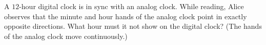 A $12$-hour digital clock is in sync with an analog clock. While reading, Alice observes that the minute and hour hands of the analog clock point in exactly opposite directions. What hour must it not show on the digital clock? (The hands of the analog clock move continuously.)
